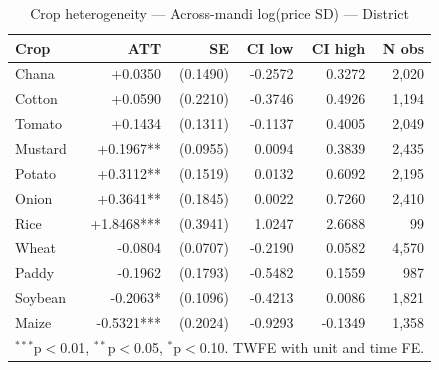 \begin{table}[htbp]
\centering
\caption{Crop heterogeneity — Across-mandi log(price SD) — District}
\label{tab:spec2_across_district_crops}
\begin{tabular}{lrrrrr}
\hline\hline
Crop & ATT & SE & CI low & CI high & N obs \\
\hline
Chana & +0.0350 & (0.1490) & -0.2572 & 0.3272 & 2,020 \\
Cotton & +0.0590 & (0.2210) & -0.3746 & 0.4926 & 1,194 \\
Tomato & +0.1434 & (0.1311) & -0.1137 & 0.4005 & 2,049 \\
Mustard & +0.1967** & (0.0955) & 0.0094 & 0.3839 & 2,435 \\
Potato & +0.3112** & (0.1519) & 0.0132 & 0.6092 & 2,195 \\
Onion & +0.3641** & (0.1845) & 0.0022 & 0.7260 & 2,410 \\
Rice & +1.8468*** & (0.3941) & 1.0247 & 2.6688 & 99 \\
Wheat & -0.0804 & (0.0707) & -0.2190 & 0.0582 & 4,570 \\
Paddy & -0.1962 & (0.1793) & -0.5482 & 0.1559 & 987 \\
Soybean & -0.2063* & (0.1096) & -0.4213 & 0.0086 & 1,821 \\
Maize & -0.5321*** & (0.2024) & -0.9293 & -0.1349 & 1,358 \\
\hline\hline
\multicolumn{6}{l}{\footnotesize $^{***}$p$<$0.01, $^{**}$p$<$0.05, $^{*}$p$<$0.10. TWFE with unit and time FE.} \\
\end{tabular}
\end{table}